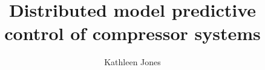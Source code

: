 \documentclass[doubleheaders,los,lof,lot,titlepage,oneside,openright,11pt]{epflthesis}
\author{Kathleen Jones}
\title{Distributed model predictive control of compressor systems}
\numberwithin{equation}{chapter}
\begin{document}












\appendix






\nocite{*}

\end{document}
